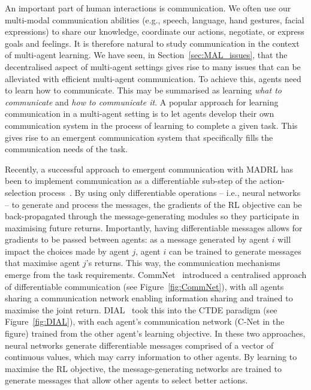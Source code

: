 An important part of human interactions is communication. We often use our multi-modal communication abilities (e.g., speech, language, hand gestures, facial expressions) to share our knowledge, coordinate our actions, negotiate, or express goals and feelings. It is therefore natural to study communication in the context of multi-agent learning. We have seen, in Section~\ref{sec:MAL_issues}, that the decentralised aspect of multi-agent settings gives rise to many issues that can be alleviated with efficient multi-agent communication. To achieve this, agents need to learn how to communicate. This may be summarised as learning \textit{what to communicate} and \textit{how to communicate it}. A popular approach for learning communication in a multi-agent setting is to let agents develop their own communication system in the process of learning to complete a given task. This gives rise to an emergent communication system that specifically fills the communication needs of the task. 

Recently, a successful approach to emergent communication with MADRL has been to implement communication as a differentiable sub-step of the action-selection process~\citep{Sukhbaatar2016_CommNet, Foerster2016_DIAL}. By using only differentiable operations -- i.e., neural networks -- to generate and process the messages, the gradients of the RL objective can be back-propagated through the message-generating modules so they participate in maximising future returns. Importantly, having differentiable messages allows for gradients to be passed between agents: as a message generated by agent $i$ will impact the choices made by agent $j$, agent $i$ can be trained to generate messages that maximise agent $j$'s returns. This way, the communication mechanisms emerge from the task requirements. CommNet~\citep{Sukhbaatar2016_CommNet} introduced a centralised approach of differentiable communication (see Figure~\ref{fig:CommNet}), with all agents sharing a communication network enabling information sharing and trained to maximise the joint return. DIAL~\citep{Foerster2016_DIAL} took this into the CTDE paradigm (see Figure~\ref{fig:DIAL}), with each agent's communication network (C-Net in the figure) trained from the other agent's learning objective. In these two approaches, neural networks generate differentiable messages comprised of a vector of continuous values, which may carry information to other agents. By learning to maximise the RL objective, the message-generating networks are trained to generate messages that allow other agents to select better actions. 

